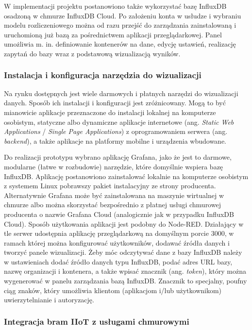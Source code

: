 \documentclass[a4paper, 12pt, twoside]{article}
\begin{document}
W implementacji projektu postanowiono także wykorzystać bazę InfluxDB
osadzoną w chmurze InfluxDB Cloud. Po założeniu konta w usłudze i wybraniu
modelu rozliczeniowego można od razu przejść do zarządzania zainstalowaną
i uruchomioną już bazą za pośrednictwem aplikacji przeglądarkowej. Panel
umożliwia m. in. definiowanie kontenerów na dane, edycję ustawień,
realizację zapytań do bazy wraz z podstawową wizualizacją wyników.


\subsubsection{Instalacja i konfiguracja narzędzia do wizualizacji}\label{grafana-conf}

Na rynku dostępnych jest wiele darmowych i płatnych narzędzi do wizualizacji danych.
Sposób ich instalacji i konfiguracji jest zróżnicowany. Mogą to być mianowicie
aplikacje przeznaczone do instalacji lokalnej na komputerze osobistym,
statyczne albo dynamiczne aplikacje internetowe (ang. \emph{Static Web Applications} / \emph{Single Page Applications})
z oprogramowaniem serwera (ang. \emph{backend}), a także
aplikacje na platformy mobilne i urządzenia wbudowane.

Do realizacji prototypu wybrano aplikację Grafana, jako że jest to darmowe,
modularne (łatwe w rozbudowie) narzędzie, które domyślnie wspiera
bazę InfluxDB. Aplikację postanowiono zainstalować lokalnie na komputerze osobistym
z systemem Linux pobrawszy pakiet instalacyjny ze strony producenta.
Alternatywnie Grafana może być zainstalowana na maszynie wirtualnej w
chmurze albo można skorzystać bezpośrednio z płatnej usługi chmurowej producenta
o nazwie Grafana Cloud (analogicznie jak w przypadku InfluxDB Cloud).
Sposób użytkowania aplikacji jest podobny do Node-RED. Działający w tle
serwer udostępnia aplikację przeglądarkową na domyślnym porcie 3000, w ramach której
można konfigurować użytkowników, dodawać źródła danych i tworzyć panele wizualizacji.
Żeby móc odczytywać dane z bazy InfluxDB należy w ustawieniach dodać źródło danych
typu InfluxDB, podać adres URL bazy, nazwę organizacji i kontenera, a także wpisać
znacznik (ang. \emph{token}), który można wygenerować w panelu
zarządzania bazą InfluxDB. Znacznik to specjalny, poufny ciąg znaków, który
umożliwia klientom (aplikacjom i/lub użytkownikom) uwierzytelnianie i autoryzację.


\subsubsection{Integracja bram IIoT z usługami chmurowymi}
\end{document}
